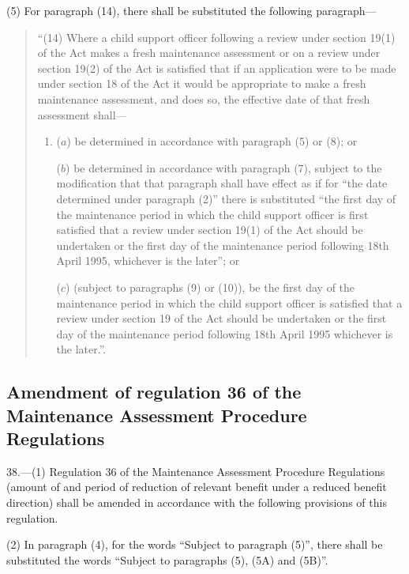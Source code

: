 \documentclass[a4paper]{article}
\begin{document}
(5) For paragraph (14), there shall be substituted the following paragraph—
\begin{quotation}
“(14) Where a child support officer following a review under section 19(1) of the Act makes a fresh maintenance assessment or on a review under section 19(2) of the Act is satisfied that if an application were to be made under section 18 of the Act it would be appropriate to make a fresh maintenance assessment, and does so, the effective date of that fresh assessment shall—
\begin{enumerate}\item[]
($a$) be determined in accordance with paragraph (5) or (8); or

($b$) be determined in accordance with paragraph (7), subject to the modification that that paragraph shall have effect as if for “the date determined under paragraph (2)” there is substituted “the first day of the maintenance period in which the child support officer is first satisfied that a review under section 19(1) of the Act should be undertaken or the first day of the maintenance period following 18th April 1995, whichever is the later”; or

($c$) (subject to paragraphs (9) or (10)), be the first day of the maintenance period in which the child support officer is satisfied that a review under section 19 of the Act should be undertaken or the first day of the maintenance period following 18th April 1995 whichever is the later.”.
\end{enumerate}
\end{quotation}

\subsection[38. Amendment of regulation 36 of the Maintenance Assessment Procedure Regulations]{Amendment of regulation 36 of the Maintenance Assessment Procedure Regulations}

38.—(1) Regulation 36 of the Maintenance Assessment Procedure Regulations (amount of and period of reduction of relevant benefit under a reduced benefit direction) shall be amended in accordance with the following provisions of this regulation.

(2) In paragraph (4), for the words “Subject to paragraph (5)”, there shall be substituted the words “Subject to paragraphs (5), (5A) and (5B)”.
\end{document}
